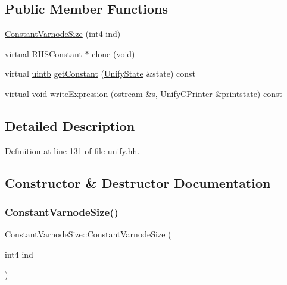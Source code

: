 \subsection*{Public Member Functions}
\begin{DoxyCompactItemize}
\item 
\mbox{\hyperlink{class_constant_varnode_size_a403abf1a08b7ee1b029cd88e4d05140e}{Constant\+Varnode\+Size}} (int4 ind)
\item 
virtual \mbox{\hyperlink{class_r_h_s_constant}{R\+H\+S\+Constant}} $\ast$ \mbox{\hyperlink{class_constant_varnode_size_ad8386fe9afbedfaa9fa8c17be0dd697c}{clone}} (void)
\item 
virtual \mbox{\hyperlink{types_8h_a2db313c5d32a12b01d26ac9b3bca178f}{uintb}} \mbox{\hyperlink{class_constant_varnode_size_a81d1d954be052fd603005228ff157add}{get\+Constant}} (\mbox{\hyperlink{class_unify_state}{Unify\+State}} \&state) const
\item 
virtual void \mbox{\hyperlink{class_constant_varnode_size_a9541e1f66f85b1ae4f333fb45daa1b02}{write\+Expression}} (ostream \&s, \mbox{\hyperlink{class_unify_c_printer}{Unify\+C\+Printer}} \&printstate) const
\end{DoxyCompactItemize}


\subsection{Detailed Description}


Definition at line 131 of file unify.\+hh.



\subsection{Constructor \& Destructor Documentation}
\mbox{\label{class_constant_varnode_size_a403abf1a08b7ee1b029cd88e4d05140e}} 
\subsubsection{\texorpdfstring{ConstantVarnodeSize()}{ConstantVarnodeSize()}}
{\footnotesize\ttfamily Constant\+Varnode\+Size\+::\+Constant\+Varnode\+Size (\begin{DoxyParamCaption}\item[{int4}]{ind }\end{DoxyParamCaption})\hspace{0.3cm}{\ttfamily [inline]}}



